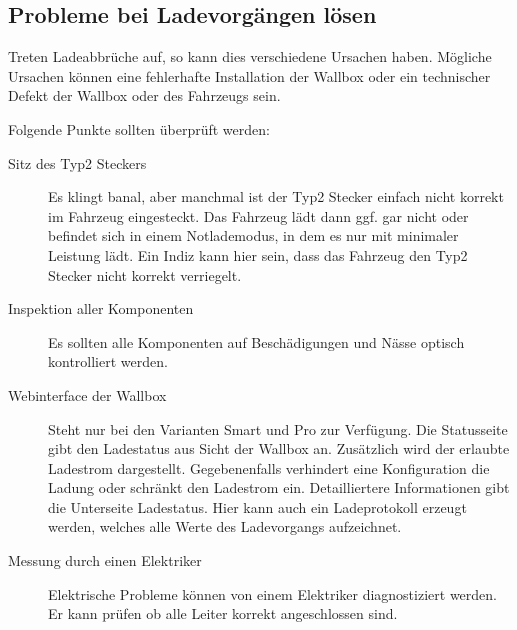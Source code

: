 \documentclass[a4paper,10pt]{article}
\begin{document}
\begin{multicols*}{2}
	\subsection{Probleme bei Ladevorgängen lösen}
	Treten Ladeabbrüche auf, so kann dies verschiedene Ursachen haben. Mögliche
	Ursachen können eine fehlerhafte Installation der Wallbox oder ein
	technischer Defekt der Wallbox oder des Fahrzeugs sein. 

	Folgende Punkte sollten überprüft werden:
	\begin{description}
		\item[Sitz des Typ2 Steckers] Es klingt banal, aber manchmal ist der
		Typ2 Stecker einfach nicht korrekt im Fahrzeug eingesteckt. Das	Fahrzeug
		lädt dann ggf. gar nicht oder befindet sich in einem Notlademodus, in
		dem es nur mit minimaler Leistung lädt. Ein Indiz kann hier sein, dass
		das Fahrzeug den Typ2 Stecker nicht korrekt verriegelt.
		\item[Inspektion aller Komponenten] Es sollten alle Komponenten
		auf Beschädigungen und Nässe optisch kontrolliert werden.
		\item[Webinterface der Wallbox] Steht nur bei den Varianten Smart und
		Pro zur Verfügung. Die Statusseite gibt den Ladestatus aus
		Sicht der Wallbox an. Zusätzlich wird der erlaubte Ladestrom
		dargestellt. Gegebenenfalls verhindert eine Konfiguration die Ladung
		oder schränkt den Ladestrom ein. Detailliertere Informationen gibt die
		Unterseite Ladestatus. Hier kann auch ein Ladeprotokoll
		erzeugt werden, welches alle Werte des Ladevorgangs aufzeichnet.
		\item[Messung durch einen Elektriker] Elektrische Probleme können von
		einem Elektriker diagnostiziert werden. Er kann prüfen ob alle Leiter
		korrekt angeschlossen sind.
	\end{description}


\end{multicols*}
\end{document}
